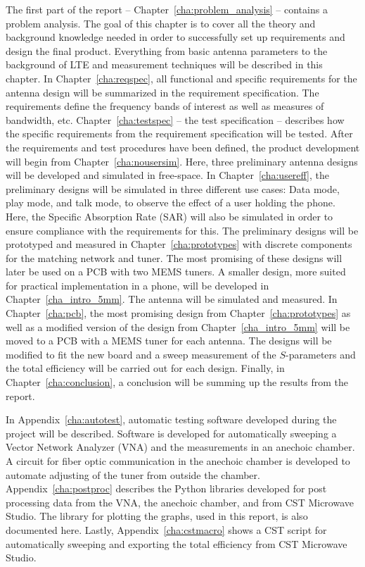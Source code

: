 The first part of the report -- Chapter~\ref{cha:problem_analysis} -- contains a problem analysis. The goal of this chapter is to cover all the theory and background knowledge needed in order to successfully set up requirements and design the final product. Everything from basic antenna parameters to the background of LTE and measurement techniques will be described in this chapter. 
In Chapter~\ref{cha:reqspec}, all functional and specific requirements for the antenna design will be summarized in the requirement specification. The requirements define the frequency bands of interest as well as measures of bandwidth, etc. 
Chapter~\ref{cha:testspec} -- the test specification -- describes how the specific requirements from the requirement specification will be tested.
After the requirements and test procedures have been defined, the product development will begin from Chapter~\ref{cha:nousersim}. Here, three preliminary antenna designs will be developed and simulated in free-space. 
In Chapter~\ref{cha:usereff}, the preliminary designs will be simulated in three different use cases: Data mode, play mode, and talk mode, to observe the effect of a user holding the phone. Here, the Specific Absorption Rate (SAR) will also be simulated in order to ensure compliance with the requirements for this.
The preliminary designs will be prototyped and measured in Chapter~\ref{cha:prototypes} with discrete components for the matching network and tuner. The most promising of these designs will later be used on a PCB with two MEMS tuners.
A smaller design, more suited for practical implementation in a phone, will be developed in Chapter~\ref{cha_intro_5mm}. The antenna will be simulated and measured.
In Chapter~\ref{cha:pcb}, the most promising design from Chapter~\ref{cha:prototypes} as well as a modified version of the design from Chapter~\ref{cha_intro_5mm} will be moved to a PCB with a MEMS tuner for each antenna. The designs will be modified to fit the new board and a sweep measurement of the $S$-parameters and the total efficiency will be carried out for each design.
Finally, in Chapter~\ref{cha:conclusion}, a conclusion will be summing up the results from the report.

In Appendix~\ref{cha:autotest}, automatic testing software developed during the project will be described. Software is developed for automatically sweeping a Vector Network Analyzer (VNA) and the measurements in an anechoic chamber. A circuit for fiber optic communication in the anechoic chamber is developed to automate adjusting of the tuner from outside the chamber.
Appendix~\ref{cha:postproc} describes the Python libraries developed for post processing data from the VNA, the anechoic chamber, and from CST Microwave Studio. The library for plotting the graphs, used in this report, is also documented here.
Lastly, Appendix~\ref{cha:cstmacro} shows a CST script for automatically sweeping and exporting the total efficiency from CST Microwave Studio.


